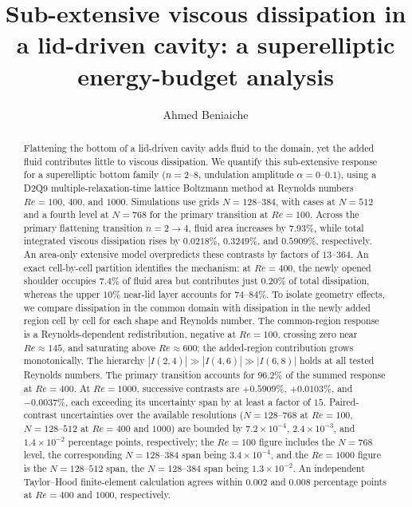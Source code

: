 \documentclass[aip,pof,reprint]{revtex4-2}
\begin{document}
\title{Sub-extensive viscous dissipation in a lid-driven cavity: a superelliptic energy-budget analysis}

\author{Ahmed Beniaiche}

\begin{abstract}
Flattening the bottom of a lid-driven cavity adds fluid to the domain, yet the added fluid contributes little to viscous dissipation. We quantify this sub-extensive response for a superelliptic bottom family ($n=2$--$8$, undulation amplitude $\alpha=0$--$0.1$), using a D2Q9 multiple-relaxation-time lattice Boltzmann method at Reynolds numbers $Re=100$, $400$, and $1000$. Simulations use grids $N=128$--$384$, with cases at $N=512$ and a fourth level at $N=768$ for the primary transition at $Re=100$. Across the primary flattening transition $n=2\to4$, fluid area increases by $7.93\%$, while total integrated viscous dissipation rises by $0.0218\%$, $0.3249\%$, and $0.5909\%$, respectively. An area-only extensive model overpredicts these contrasts by factors of $13$--$364$. An exact cell-by-cell partition identifies the mechanism: at $Re=400$, the newly opened shoulder occupies $7.4\%$ of fluid area but contributes just $0.20\%$ of total dissipation, whereas the upper $10\%$ near-lid layer accounts for $74$--$84\%$. To isolate geometry effects, we compare dissipation in the common domain with dissipation in the newly added region cell by cell for each shape and Reynolds number. The common-region response is a Reynolds-dependent redistribution, negative at $Re=100$, crossing zero near $Re\approx145$, and saturating above $Re\approx600$; the added-region contribution grows monotonically. The hierarchy $|I(2,4)|\gg|I(4,6)|\gg|I(6,8)|$ holds at all tested Reynolds numbers. The primary transition accounts for $96.2\%$ of the summed response at $Re=400$. At $Re=1000$, successive contrasts are $+0.5909\%$, $+0.0103\%$, and $-0.0037\%$, each exceeding its uncertainty span by at least a factor of $15$. Paired-contrast uncertainties over the available resolutions ($N=128$--$768$ at $Re=100$, $N=128$--$512$ at $Re=400$ and $1000$) are bounded by $7.2\times10^{-4}$, $2.4\times10^{-3}$, and $1.4\times10^{-2}$ percentage points, respectively; the $Re=100$ figure includes the $N=768$ level, the corresponding $N=128$--$384$ span being $3.4\times10^{-4}$, and the $Re=1000$ figure is the $N=128$--$512$ span, the $N=128$--$384$ span being $1.3\times10^{-2}$. An independent Taylor--Hood finite-element calculation agrees within $0.002$ and $0.008$ percentage points at $Re=400$ and $1000$, respectively.
\end{abstract}
\end{document}
